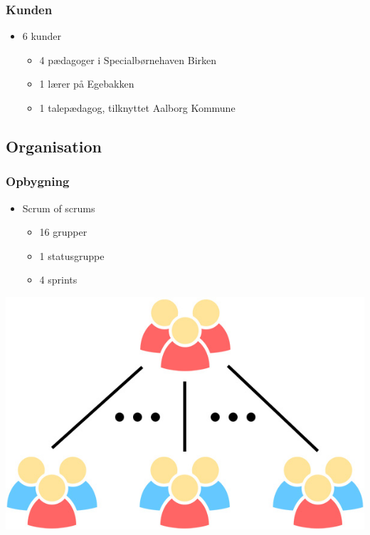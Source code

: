 \begin{frame}
\frametitle{Kunden}

\begin{itemize}
\item 6 kunder
\begin{itemize}
\item 4 pædagoger i Specialbørnehaven Birken
\item 1 lærer på Egebakken
\item 1 talepædagog, tilknyttet Aalborg Kommune
\end{itemize}
\end{itemize}

\end{frame}

\subsection{Organisation}

\begin{frame}
\frametitle{Opbygning}

\begin{itemize}
\item Scrum of scrums
\begin{itemize}
\item 16 grupper
\item 1 statusgruppe
\item 4 sprints
\end{itemize}
\end{itemize}

\centering\includegraphics[height=.5\textheight]{pgraphics/scrum-of-scrums}

\end{frame}

